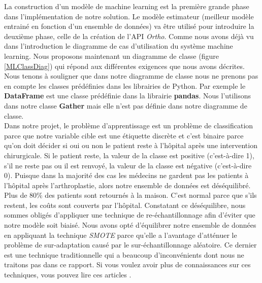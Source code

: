 \documentclass[12pt, french]{report}
\begin{document}
La construction d'un modèle de machine learning est la première grande phase dans l'implémentation de notre solution. Le modèle estimateur (meilleur modèle entrainé en fonction d'un ensemble de données) va être utilisé pour introduire la deuxième phase, celle de la création de l'API \textit{Ortho}. Comme nous avons déjà vu dans l'introduction le diagramme de cas d'utilisation du système machine learning. Nous proposons maintenant un diagramme de classe (figure \ref{MLClassDiag}) qui répond aux différentes exigences que nous avons décrites. Nous tenons à souligner que dans notre diagramme de classe nous ne prenons pas en compte les classes prédéfinies dans les librairies de Python. Par exemple le \textbf{DataFrame} est une classe prédéfinie dans la librairie \textbf{pandas}. Nous l'utilisons dans notre classe \textbf{Gather} mais elle n'est pas définie dans notre diagramme de classe.  \\ 

Dans notre projet, le problème d'apprentissage est un problème de classification parce que notre variable cible est une étiquette discrète et c'est binaire parce qu'on doit décider si oui ou non le patient reste à l'hôpital après une intervention chirurgicale. Si le patient reste, la valeur de la classe est positive (c'est-à-dire 1), s'il ne reste pas ou il est renvoyé, la valeur de la classe est négative (c'est-à-dire 0). Puisque dans la majorité des cas les médecins ne gardent pas les patients à l'hôpital après l'arthroplastie, alors notre ensemble de données est déséquilibré. Plus de 80\% des patients sont retournés à la maison. C'est normal parce que s'ils restent, les coûts sont couverts par l'hôpital. Constatant ce déséquilibre, nous sommes obligés d'appliquer une technique de re-échantillonnage afin d'éviter que notre modèle soit biaisé.  Nous avons opté d'équilibrer notre ensemble de données en appliquant la technique \textit{SMOTE} parce qu'elle a l'avantage d'atténuer le problème de sur-adaptation causé par le sur-échantillonnage aléatoire. Ce dernier est une technique traditionnelle qui a beaucoup d'inconvénients dont nous ne traitons pas dans ce rapport. Si vous voulez avoir plus de connaissances sur ces techniques, vous pouvez lire ces articles \cite{key45, key23, key29}. \\

\end{document}
